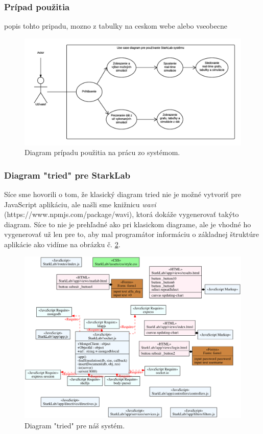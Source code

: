 \subsubsection{Prípad použitia}
popis tohto pripadu, mozno z tabulky na ceskom webe alebo vseobecne

\begin{figure}[H]
  \centering
  \includegraphics[scale=0.7]{img/diagrams/use-case.png}
  \caption{Diagram prípadu použitia na prácu zo systémom.}
  \label{img-use-case}
\end{figure}

\subsubsection{Diagram "tried" pre StarkLab}
Síce sme hovorili o tom, že klasický diagram tried nie je možné vytvoriť pre JavaScript aplikáciu, ale našli sme knižnicu \textit{wavi} (https://www.npmjs.com/package/wavi), ktorá dokáže vygenerovať takýto diagram. Síce to nie je prehľadné ako pri klasickom diagrame, ale je vhodné ho vygenerovať už len pre to, aby mal programátor informáciu o základnej štruktúre aplikácie ako vidíme na obrázku č. \ref{img-class-diagram}.

\begin{figure}[H]
  \centering
  \includegraphics[scale=0.40]{img/diagrams/class.png}
  \caption{Diagram "tried" pre náš systém.}
  \label{img-class-diagram}
\end{figure}

